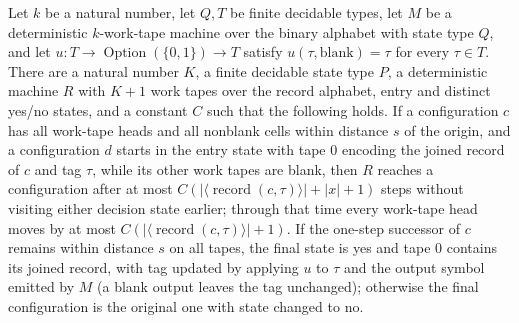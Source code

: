 \begin{theorem}
\label{Turing.exists_recordStepTM}
\leanok
{}
Let $k$ be a natural number, let $Q,T$ be finite decidable types, let $M$ be a
deterministic $k$-work-tape machine over the binary alphabet with state type $Q$, and
let $u:T\to\operatorname{Option}(\{0,1\})\to T$ satisfy $u(\tau,\mathrm{blank})=\tau$
for every $\tau\in T$. There are a natural number $K$, a finite decidable state type
$P$, a deterministic machine $R$ with $K+1$ work tapes over the record alphabet, entry
and distinct yes/no states, and a constant $C$ such that the following holds. If a
configuration $c$ has all work-tape heads and all nonblank cells within distance $s$ of
the origin, and a configuration $d$ starts in the entry state with tape $0$ encoding the
joined record of $c$ and tag $\tau$, while its other work tapes are blank, then $R$
reaches a configuration after at most
$C(|\langle\operatorname{record}(c,\tau)\rangle|+|x|+1)$ steps without visiting either
decision state earlier; through that time every work-tape head moves by at most
$C(|\langle\operatorname{record}(c,\tau)\rangle|+1)$. If the one-step successor of $c$
remains within distance $s$ on all tapes, the final state is yes and tape $0$ contains
its joined record, with tag updated by applying $u$ to $\tau$ and the output symbol
emitted by $M$ (a blank output leaves the tag unchanged); otherwise the final
configuration is the original one with state changed to no.
\end{theorem}

